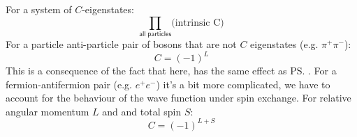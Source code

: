For a system of $C$-eigenstates:
\[
\prod\limits_{\mathsf{all\;particles}}
\mbox{(intrinsic C)}
\]
For a particle anti-particle pair of bosons that are not $C$
eigenstates (e.g. $\pi^+\pi^-$):
\[
C = (-1)^L
\]
This is a consequence of the fact that here, \cs has the same effect as \ps.
For a fermion-antifermion pair (e.g. $e^+ e^-$) it's a bit more complicated, we have to account for the behaviour of the wave function under spin exchange. For relative angular momentum $L$ and and total spin $S$:
\[
C = (-1)^{L+S}
\]




